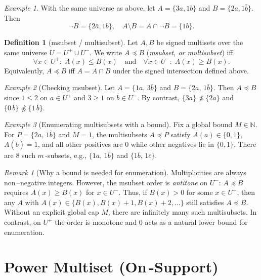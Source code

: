 \documentclass{article}
\theoremstyle{plain}
\theoremstyle{definition}
\newtheorem{definition}{Definition}
\theoremstyle{remark}
\newtheorem*{remark}{Remark}
\newtheorem{example}{Example}
\newcommand{\Nat}{\mathbb{N}}
\begin{document}
\begin{example}
	With the same universe as above, let
	\( A = \{ 3a, 1b \} \) and \( B = \{ 2a, 1\bar{b} \} \).
	Then
	\[
	\neg B = \{ 2\bar{a}, 1b \}, \quad
	A \setminus B = A \cap \neg B = \{ 1b \}.
	\]
\end{example}

\begin{definition}[msubset / multisubset]
Let \(A, B\) be signed multisets over the same universe \(U = U^+ \cup U^-\). We write \(A \preceq B\) (\emph{msubset, or multisubset}) iff
\[
\forall x \in U^+\!:\; A(x) \le B(x) \quad\text{and}\quad \forall x \in U^-\!:\; A(x) \ge B(x).
\]
Equivalently, \(A \preceq B\) iff \(A = A \cap B\) under the signed intersection defined above.
\end{definition}

\begin{example}[Checking msubset]
Let \(A = \{1a,\,3\bar{b}\}\) and \(B = \{2a,\,1\bar{b}\}\). Then
\(A \preceq B\) since \(1 \le 2\) on \(a \in U^+\) and \(3 \ge 1\) on \(\bar{b} \in U^-\).
By contrast, \(\{3a\} \not\preceq \{2a\}\) and \(\{0\,\bar{b}\} \not\preceq \{1\,\bar{b}\}\).
\end{example}

\begin{example}[Enumerating multisubsets with a bound]
Fix a global bound \(M\in\Nat\). For \(P = \{2a,\,1\bar{b}\}\) and \(M=1\), the multisubsets \(A\preceq P\) satisfy
\(A(a)\in\{0,1\}\), \(A(\bar{b})=1\), and all other positives are \(0\) while other negatives lie in \(\{0,1\}\). There are \(8\) such $m$\,-subsets, e.g.,
\(\{1a,\,1\bar{b}\}\) and \(\{1\bar{b},\,1\bar{c}\}\).
\end{example}

\begin{remark}[Why a bound is needed for enumeration]
Multiplicities are always non\,--negative integers. However, the msubset order is \emph{antitone} on \(U^-\): \(A \preceq B\) requires \(A(x) \ge B(x)\) for \(x\in U^-\). Thus, if \(B(x)>0\) for some \(x\in U^-\), then any \(A\) with \(A(x)\in\{B(x), B(x)+1, B(x)+2,\dots\}\) still satisfies \(A \preceq B\). Without an explicit global cap \(M\), there are infinitely many such multisubsets. In contrast, on \(U^+\) the order is monotone and \(0\) acts as a natural lower bound for enumeration.
\end{remark}

\section*{Power Multiset (On\,-Support)}
\end{document}
